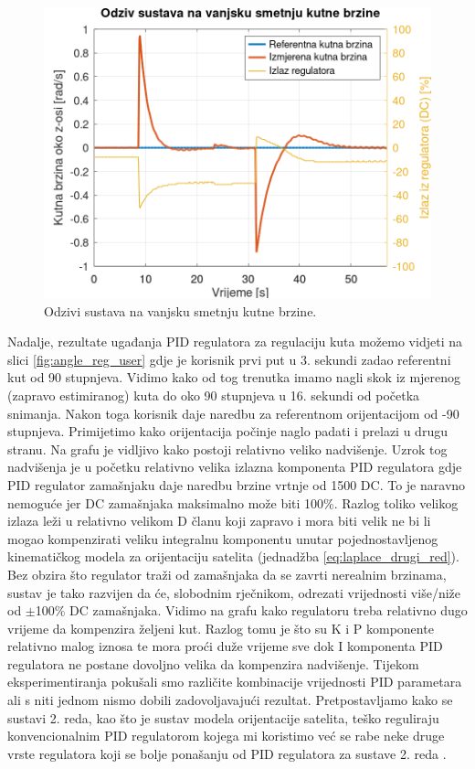 \documentclass[times, utf8, diplomski, numeric]{templates/template}
\begin{document}
{{        \begin{figure}[htb]
        \centering
        \includegraphics[width=1.0\textwidth]{other/ang_vel_reg_dist.png}
        \caption{Odzivi sustava na vanjsku smetnju kutne brzine.}
        \label{fig:ang_vel_reg_dist}
        \end{figure}

        Nadalje, rezultate ugađanja PID regulatora za regulaciju kuta možemo vidjeti na slici \ref{fig:angle_reg_user} gdje je korisnik prvi put u 3. sekundi zadao referentni kut od 90 stupnjeva. Vidimo kako od tog trenutka imamo nagli skok iz mjerenog (zapravo estimiranog) kuta do oko 90 stupnjeva u 16. sekundi od početka snimanja. Nakon toga korisnik daje naredbu za referentnom orijentacijom od -90 stupnjeva. Primijetimo kako orijentacija počinje naglo padati i prelazi u drugu stranu. Na grafu je vidljivo kako postoji relativno veliko nadvišenje. Uzrok tog nadvišenja je u početku relativno velika izlazna komponenta PID regulatora gdje PID regulator zamašnjaku daje naredbu brzine vrtnje od 1500 DC. To je naravno nemoguće jer DC zamašnjaka maksimalno može biti 100\%. Razlog toliko velikog izlaza leži u relativno velikom D članu koji zapravo i mora biti velik ne bi li mogao kompenzirati veliku integralnu komponentu unutar pojednostavljenog kinematičkog modela za orijentaciju satelita (jednadžba \ref{eq:laplace_drugi_red}). Bez obzira što regulator traži od zamašnjaka da se zavrti nerealnim brzinama, sustav je tako razvijen da će, slobodnim rječnikom, odrezati  vrijednosti više/niže od $\pm$100\% DC zamašnjaka. Vidimo na grafu kako regulatoru treba relativno dugo vrijeme da kompenzira željeni kut. Razlog tomu je što su K i P komponente relativno malog iznosa te mora proći duže vrijeme sve dok I komponenta PID regulatora ne postane dovoljno velika da kompenzira nadvišenje. Tijekom eksperimentiranja pokušali smo različite kombinacije vrijednosti PID parametara ali s niti jednom nismo dobili zadovoljavajući rezultat. Pretpostavljamo kako se sustavi 2. reda, kao što je sustav modela orijentacije satelita, teško reguliraju konvencionalnim PID regulatorom kojega mi koristimo već se rabe neke druge vrste regulatora koji se bolje ponašanju od PID regulatora za sustave 2. reda \cite{reg_2_red}. 
        
}}
\end{document}
